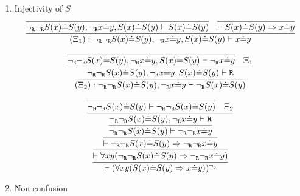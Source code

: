 \begin{enumerate}
    \item Injectivity of $S$
    $$    
                                \infer{
                                    (\Xi_1) : \neg_\R\neg_\R S(x)\dot{=}S(y), \neg_\R x\dot{=}y, S(x)\dot{=}S(y)  \vdash x\dot{=}y
                                }{
                                    \infer{
                                        \neg_\R\neg_\R S(x)\dot{=}S(y), \neg_\R x\dot{=}y, S(x)\dot{=}S(y)  \vdash S(x)\dot{=}S(y) 
                                    }{
                                    }&
                                    \infer{
                                        \vdash S(x)\dot{=}S(y) \Rightarrow x\dot{=}y
                                    }{
                                    }
                                }
    $$
    
    
    $$
    \infer{
                            (\Xi_2) : \neg_\R\neg_\R S(x)\dot{=}S(y), \neg_\R x\dot{=}y \vdash \neg_\R S(x)\dot{=}S(y) 
                        }{
                            \infer{
                                \neg_\R\neg_\R S(x)\dot{=}S(y), \neg_\R x\dot{=}y, S(x)\dot{=}S(y)  \vdash\R 
                            }{
                                \infer{
                                    \neg_\R\neg_\R S(x)\dot{=}S(y), \neg_\R x\dot{=}y, S(x)\dot{=}S(y)  \vdash\neg_\R x\dot{=}y
                                }{
                                }&
                                \Xi_1
                            }
                        }
    $$    
    
    $$
    \infer{
        \vdash (\forall xy (S(x)\dot{=}S(y) \Rightarrow x\dot{=}y))^{\neg_\R}
    }{
        \infer{
            \vdash \forall xy (\neg_\R\neg_\R S(x)\dot{=}S(y) \Rightarrow \neg_\R\neg_\R x\dot{=}y)
        }{
            \infer{
                \vdash \neg_\R\neg_\R S(x)\dot{=}S(y) \Rightarrow \neg_\R\neg_\R x\dot{=}y
            }{
                \infer{
                    \neg_\R\neg_\R S(x)\dot{=}S(y) \vdash\neg_\R\neg_\R x\dot{=}y
                }{
                    \infer{
                        \neg_\R\neg_\R S(x)\dot{=}S(y), \neg_\R x\dot{=}y \vdash \R 
                    }{
                        \infer{
                            \neg_\R\neg_\R S(x)\dot{=}S(y) \vdash \neg_\R\neg_\R S(x)\dot{=}S(y) 
                        }{
                        }&
                        \Xi_2
                    }
                }
            }
        }
    }
    $$
    
    \item Non confusion
    

\end{enumerate}

